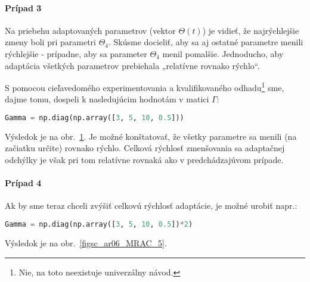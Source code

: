 \documentclass[a4paper, 10pt, ]{article}
\begin{document}
\paragraph{Prípad 3}

Na priebehu adaptovaných parametrov (vektor $\Theta(t)$) je vidieť, že najrýchlejšie zmeny boli pri parametri $\Theta_4$. Skúsme docieliť, aby sa aj ostatné parametre menili rýchlejšie - prípadne, aby sa parameter $\Theta_4$ menil pomalšie. Jednoducho, aby adaptácia všetkých parametrov prebiehala „relatívne rovnako rýchlo“.

S pomocou cieľavedomého experimentovania a kvalifikovaného odhadu\footnote{Nie, na toto neexistuje univerzálny návod.} sme, dajme tomu, dospeli k nasledujúcim hodnotám v matici $\Gamma$:
\begin{lstlisting}[language=Python,
                    numbers=none,
                    ]
Gamma = np.diag(np.array([3, 5, 10, 0.5]))
\end{lstlisting}
Výsledok je na obr.~\ref{figsc_ar06_MRAC_4}. Je možné konštatovať, že všetky parametre sa menili (na začiatku určite) rovnako rýchlo. Celková rýchlosť zmenšovania sa adaptačnej odchýlky je však pri tom relatívne rovnaká ako v predchádzajúvom prípade.





\begin{figure}[!t]
	\centering

    \vspace{-3mm}


    \vspace{-2mm}

	\caption{}
	\label{figsc_ar06_MRAC_4}


    \vspace{-2mm}

\end{figure}










\paragraph{Prípad 4}

Ak by sme teraz chceli zvýšiť celkovú rýchlosť adaptácie, je možné urobiť napr.:
\begin{lstlisting}[language=Python,
                    numbers=none,
                    ]
Gamma = np.diag(np.array([3, 5, 10, 0.5])*2)
\end{lstlisting}
Výsledok je na obr.~\ref{figsc_ar06_MRAC_5}.
\end{document}
